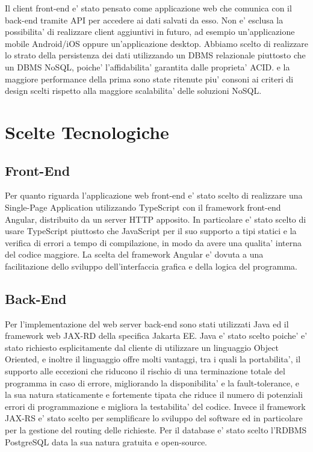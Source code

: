 \newline
Il client front-end e' stato pensato come applicazione web che comunica con il back-end tramite API per accedere ai dati salvati da esso. Non e' esclusa la possibilita' di realizzare client aggiuntivi in futuro, ad esempio un'applicazione mobile Android/iOS oppure un'applicazione desktop.
\newline
Abbiamo scelto di realizzare lo strato della persistenza dei dati utilizzando un DBMS relazionale piuttosto che un DBMS NoSQL, poiche' l'affidabilita' garantita dalle proprieta' ACID. e la maggiore performance della prima sono state ritenute piu' consoni ai criteri di design scelti rispetto alla maggiore scalabilita' delle soluzioni NoSQL.


\section{Scelte Tecnologiche}
\subsection{Front-End}
Per quanto riguarda l'applicazione web front-end e' stato scelto di realizzare una Single-Page Application utilizzando TypeScript con il framework front-end Angular, distribuito da un server HTTP apposito. 
In particolare e' stato scelto di usare TypeScript piuttosto che JavaScript per il suo supporto a tipi statici e la verifica di errori a tempo di compilazione, in modo da avere una qualita' interna del codice maggiore. 
La scelta del framework Angular e' dovuta a una facilitazione dello sviluppo dell'interfaccia grafica e della logica del programma.
\subsection{Back-End}
Per l'implementazione del web server back-end sono stati utilizzati Java ed il framework web JAX-RD della specifica Jakarta EE. Java e' stato scelto poiche' e' stato richiesto esplicitamente dal cliente di utilizzare un linguaggio Object Oriented, e inoltre il linguaggio offre molti vantaggi, tra i quali la portabilita', il supporto alle eccezioni che riducono il rischio di una terminazione totale del programma in caso di errore, migliorando la disponibilita' e la fault-tolerance, e la sua natura staticamente e fortemente tipata che riduce il numero di potenziali errori di programmazione e migliora la testabilita' del codice. Invece il framework JAX-RS e' stato scelto per semplificare lo sviluppo del software ed in particolare per la gestione del routing delle richieste. Per il database e' stato scelto l'RDBMS PostgreSQL data la sua natura gratuita e open-source. 
